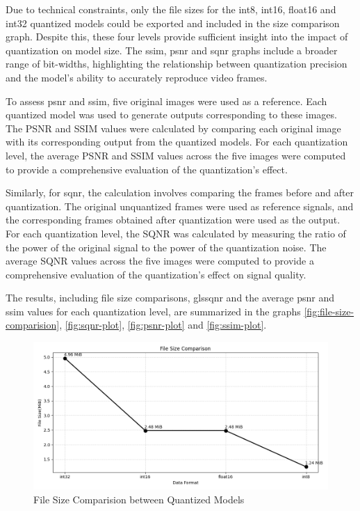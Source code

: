 \documentclass{ioereport}
\begin{document}
    Due to technical constraints, only the file sizes for the int8, int16, float16 and int32 quantized models could be exported and included in the size comparison graph. Despite this, these four levels provide sufficient insight into the impact of quantization on model size. The \gls{ssim}, \gls{psnr} and \gls{sqnr} graphs include a broader range of bit-widths, highlighting the relationship between quantization precision and the model's ability to accurately reproduce video frames.

    To assess \gls{psnr} and \gls{ssim}, five original images were used as a reference. Each quantized model was used to generate outputs corresponding to these images. The PSNR and SSIM values were calculated by comparing each original image with its corresponding output from the quantized models. For each quantization level, the average PSNR and SSIM values across the five images were computed to provide a comprehensive evaluation of the quantization's effect.

    Similarly, for \gls{sqnr}, the calculation involves comparing the frames before and after quantization. The original unquantized frames were used as reference signals, and the corresponding frames obtained after quantization were used as the output. For each quantization level, the SQNR was calculated by measuring the ratio of the power of the original signal to the power of the quantization noise. The average SQNR values across the five images were computed to provide a comprehensive evaluation of the quantization's effect on signal quality.    

    The results, including file size comparisons, gls{sqnr} and the average \gls{psnr} and \gls{ssim} values for each quantization level, are summarized in the graphs \autoref{fig:file-size-comparision}, \autoref{fig:sqnr-plot}, \autoref{fig:psnr-plot} and \autoref{fig:ssim-plot}.
    
    \begin{figure}[H]
        \centering
        \includegraphics[height=0.4\textwidth]{assets/quantization/size_plot.png}
        \caption{File Size Comparision between Quantized Models}
        \label{fig:file-size-comparision}
    \end{figure}
\end{document}
